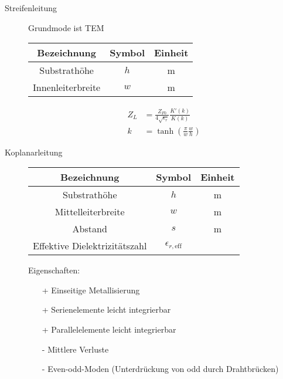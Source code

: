 \begin{description}
\item[Streifenleitung] Grundmode ist TEM
\begin{center}
\begin{tabular}{ccc} \toprule
Bezeichnung & Symbol & Einheit \\ \midrule
Substrathöhe & $h$ & \si{\meter} \\
Innenleiterbreite & $w$ & \si{\meter} \\
\bottomrule
\end{tabular}
\end{center}

\begin{center}
\begin{tikzpicture}[scale=0.2, every node/.style={scale=0.8}]

\end{tikzpicture}
\end{center}

\begin{align*}
Z_L &= \frac{Z_{F0}}{4 \sqrt{\epsilon_r}} \frac{K'(k)}{K(k)} \\
k &= \tanh \left( \frac{\pi}{w} \frac{w}{h} \right)
\end{align*}

\item[Koplanarleitung] \strut
\begin{center}
\begin{tabular}{ccc} \toprule
Bezeichnung & Symbol & Einheit \\ \midrule
Substrathöhe & $h$ & \si{\meter} \\
Mittelleiterbreite & $w$ & \si{\meter} \\
Abstand & $s$ & \si{\meter} \\
Effektive Dielektrizitätszahl & $\epsilon_{r,\text{eff}}$ \\
\bottomrule
\end{tabular}
\end{center}
Eigenschaften:
\begin{itemize}
\item[+] Einseitige Metallisierung
\item[+] Serienelemente leicht integrierbar
\item[+] Parallelelemente leicht integrierbar
\item[-] Mittlere Verluste
\item[-] Even-odd-Moden (Unterdrückung von odd durch Drahtbrücken)
\end{itemize}
\begin{center}
\begin{tikzpicture}[scale=0.2, every node/.style={scale=0.8}]

\end{tikzpicture}
\end{center}


\end{description}
